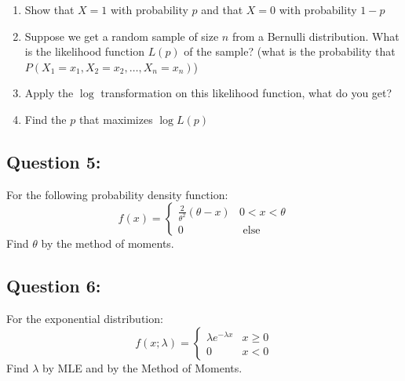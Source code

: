 \documentclass[
]{article}
\providecommand{\tightlist}{%
  \setlength{\itemsep}{0pt}\setlength{\parskip}{0pt}}
\begin{document}
\begin{enumerate}
\def\labelenumi{\arabic{enumi}.}
\tightlist
\item
  Show that \(X=1\) with probability \(p\) and that \(X=0\) with
  probability \(1-p\)
\item
  Suppose we get a random sample of size \(n\) from a Bernulli
  distribution. What is the likelihood function \(L(p)\) of the sample?
  (what is the probability that
  \(P\left(X_{1}=x_{1}, X_{2}=x_{2}, \ldots, X_{n}=x_{n}\right)\))
\item
  Apply the \(\log\) transformation on this likelihood function, what do
  you get?
\item
  Find the \(p\) that maximizes \(\log L(p)\)
\end{enumerate}

\hypertarget{question-5}{%
\subsection{Question 5:}\label{question-5}}

For the following probability density function:
\[f(x)=\left\{\begin{array}{ll}{\frac{2}{\theta^{2}}(\theta-x)} & {0<x<\theta} \\ {0} & {\text { else }}\end{array}\right.\]
Find \(\theta\) by the method of moments.

\hypertarget{question-6}{%
\subsection{Question 6:}\label{question-6}}

For the exponential distribution:
\[f(x ; \lambda)=\left\{\begin{array}{ll}{\lambda e^{-\lambda x}} & {x \geq 0} \\ {0} & {x<0}\end{array}\right.\]
Find \(\lambda\) by MLE and by the Method of Moments.
\end{document}
